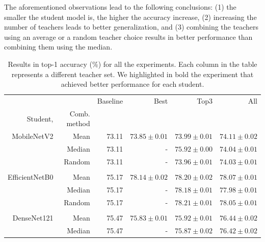 \documentclass{elsarticle}
\begin{document}
	The aforementioned observations lead to the following conclusions: (1) the smaller the student model is, the higher the accuracy increase, (2) increasing the number of teachers leads to better generalization, and (3) combining the teachers using an average or a random teacher choice results in better performance than combining them using the median.
	
	\begin{table}[h]
	 \footnotesize
	\centering

	\caption{Results in top-1 accuracy (\%) for all the experiments. Each column in the table represents a different teacher set. We highlighted in bold the experiment that achieved better performance for each student.}
	\begin{tabular}{rrrrrr}
		\toprule
		               &              & Baseline &              Best &              Top3 &               All \\
		      Student, & Comb. method &          &                   &                   &                   \\ \midrule
		   MobileNetV2 &         Mean &    73.11& $ 73.85 \pm 0.01$ &  $73.99 \pm 0.01$ &  $\mathbf{74.11 \pm 0.02}$ \\
		               &       Median &    73.11 &                 - &  $75.92 \pm 0.00$ &  $74.04 \pm 0.01$ \\
		               &       Random &    73.11 &                 - &  $73.96 \pm 0.01$ &  $74.03 \pm 0.01$ \\
		               &              &          &                   &                   &                   \\
		EfficientNetB0 &         Mean &    75.17 & $ 78.14 \pm 0.02$ &  $78.20 \pm 0.02$ &  $78.07 \pm 0.01$ \\
		               &       Median &    75.17 &                 - &  $78.18 \pm 0.01$ &  $77.98 \pm 0.01$ \\
		               &       Random &    75.17 &                 - &  $\mathbf{78.21 \pm 0.01}$ &  $78.05 \pm 0.01$ \\
		               &              &          &                   &                   &                   \\
		   DenseNet121 &         Mean &    75.47 & $ 75.83 \pm 0.01$ &  $75.92 \pm 0.01$ &  $\mathbf{76.44 \pm 0.02}$ \\
		               &       Median &    75.47 &                 - & $ 75.87 \pm 0.02$ & $ 76.42 \pm 0.02$ \\

\end{tabular}
\end{table}
\end{document}

